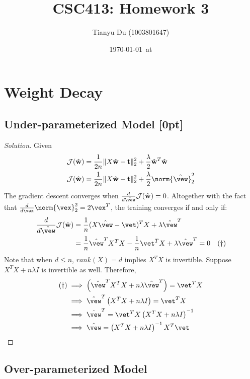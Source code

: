 \documentclass{article}
\title{CSC413: Homework 3}
\date{\today\ at \currenttime}
\author{Tianyu Du (1003801647)}
\begin{document}
	\maketitle
	\section{Weight Decay}
	\subsection{Under-parameterized Model [0pt]}
	\begin{proof}[Solution]
		Given
	\begin{align}
		\mathcal{J}(\hat{\mathbf{w}})&=\frac{1}{2 n}\|X \hat{\mathbf{w}}-\mathbf{t}\|_{2}^2
		+\frac{\lambda}{2} \hat{\mathbf{w}}^{T} \hat{\mathbf{w}} \\
		\mathcal{J}(\hat{\mathbf{w}})&=\frac{1}{2 n}\|X \hat{\mathbf{w}}-\mathbf{t}\|_{2}^2
		+\frac{\lambda}{2} \norm{\hat{\vew}}_2^2
	\end{align}
	The gradient descent converges when $\frac{d}{d\hat{\vew}} \mathcal{J}(\hat{\mathbf{w}}) = 0$. Altogether with the fact that $\frac{d}{d\vex} \norm{\vex}_2^2 = 2 \vex^T$, the training converges if and only if:
	\begin{align}
		\frac{d}{d\hat{\vew}} \mathcal{J}(\hat{\mathbf{w}})
		&= \frac{1}{n} (X \hat{\vew} - \vet)^T X + \lambda \hat{\vew}^T \\
		&= \frac{1}{n} \hat{\vew}^T X^T X - \frac{1}{n} \vet^T X + \lambda \hat{\vew}^T = 0\quad (\dagger)
	\end{align}
	Note that when $d \leq n$, $rank(X) = d$ implies $X^T X$ is invertible. Suppose $X^T X + n \lambda I$ is invertible as well. Therefore,
	\begin{align}
		(\dagger) &\implies \left(\hat{\vew}^T X^T X + n \lambda \hat{\vew}^T \right) = \vet^T X \\
		&\implies \hat{\vew}^T \left(X^T X + n \lambda I \right) = \vet^T X \\
		&\implies \hat{\vew}^T = \vet^T X \left(X^T X + n \lambda I \right)^{-1} \\
		&\implies \hat{\vew} = \left(X^T X + n \lambda I \right)^{-1} X^T \vet
	\end{align}
	\end{proof}
	
	\subsection{Over-parameterized Model}
\end{document}

